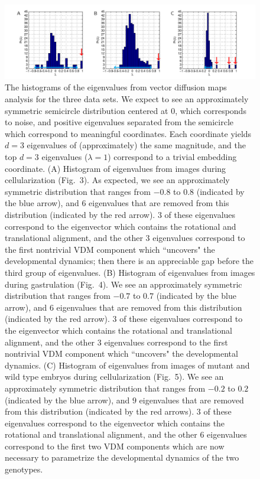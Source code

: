 \documentclass{pnastwo}
\newcommand{\fig}[0]{Fig.}
\begin{document}
\begin{figure}
\includegraphics{figS6}
\caption{The histograms of the eigenvalues from vector diffusion maps analysis for the three data sets.
%
We expect to see an approximately symmetric semicircle distribution centered at 0, which corresponds to noise, and positive eigenvalues separated from the semicircle which correspond to meaningful coordinates.
%
Each coordinate yields $d=3$ eigenvalues of (approximately) the same magnitude, and the top $d=3$ eigenvalues ($\lambda=1$) correspond to a trivial embedding coordinate.
%
(A) Histogram of eigenvalues from images during cellularization (\fig~3). As expected, we see an approximately symmetric distribution that ranges from $-0.8$ to $0.8$ (indicated by the blue arrow), and $6$ eigenvalues that are removed from this distribution (indicated by the red arrow). $3$ of these eigenvalues correspond to the eigenvector which contains the rotational and translational alignment, and the other $3$ eigenvalues correspond to the first nontrivial VDM component which ``uncovers" the developmental dynamics; then there is an appreciable gap before the third group of eigenvalues.
%
(B) Histogram of eigenvalues from images during gastrulation (\fig~4). We see an approximately symmetric distribution that ranges from $-0.7$ to $0.7$ (indicated by the blue arrow), and $6$ eigenvalues that are removed from this distribution (indicated by the red arrow). $3$ of these eigenvalues correspond to the eigenvector which contains the rotational and translational alignment, and the other $3$ eigenvalues correspond to the first nontrivial VDM component which ``uncovers" the developmental dynamics.
%
(C) Histogram of eigenvalues from images of mutant and wild type embryos during cellularization (\fig~5).
We see an approximately symmetric distribution that ranges from $-0.2$ to $0.2$ (indicated by the blue arrow), and $9$ eigenvalues that are removed from this distribution (indicated by the red arrows). $3$ of these eigenvalues correspond to the eigenvector which contains the rotational and translational alignment, and the other $6$ eigenvalues correspond to the first two VDM components which are now necessary to parametrize the developmental dynamics of the two genotypes.}
\label{fig:eval_spectra}
\end{figure}
\end{document}
